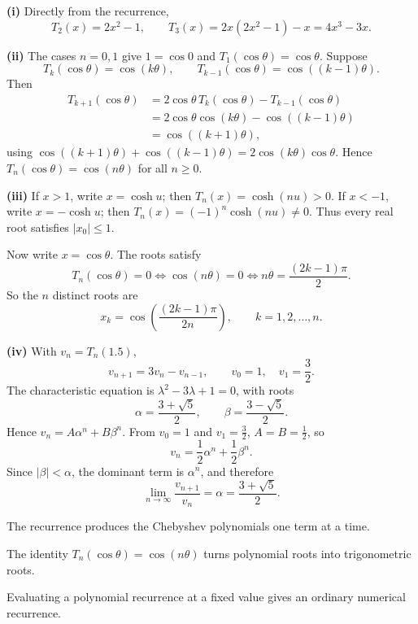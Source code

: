 \newpage
\begin{solution}
\textbf{(i)} Directly from the recurrence,
\[
T_2(x)=2x^2-1,\qquad
T_3(x)=2x(2x^2-1)-x=4x^3-3x.
\]

\textbf{(ii)} The cases $n=0,1$ give $1=\cos0$ and $T_1(\cos\theta)=\cos\theta$. Suppose
\[
T_k(\cos\theta)=\cos(k\theta),\qquad
T_{k-1}(\cos\theta)=\cos((k-1)\theta).
\]
Then
\[
\begin{aligned}
T_{k+1}(\cos\theta)
&=2\cos\theta\,T_k(\cos\theta)-T_{k-1}(\cos\theta)\\
&=2\cos\theta\cos(k\theta)-\cos((k-1)\theta)\\
&=\cos((k+1)\theta),
\end{aligned}
\]
using $\cos((k+1)\theta)+\cos((k-1)\theta)=2\cos(k\theta)\cos\theta$. Hence $T_n(\cos\theta)=\cos(n\theta)$ for all $n\ge0$.

\textbf{(iii)} If $x>1$, write $x=\cosh u$; then $T_n(x)=\cosh(nu)>0$. If $x<-1$, write $x=-\cosh u$; then $T_n(x)=(-1)^n\cosh(nu)\ne0$. Thus every real root satisfies $|x_0|\le1$.

Now write $x=\cos\theta$. The roots satisfy
\[
T_n(\cos\theta)=0\iff \cos(n\theta)=0
\iff n\theta=\frac{(2k-1)\pi}{2}.
\]
So the $n$ distinct roots are
\[
x_k=\cos\left(\frac{(2k-1)\pi}{2n}\right),\qquad k=1,2,\ldots,n.
\]

\textbf{(iv)} With $v_n=T_n(1.5)$,
\[
v_{n+1}=3v_n-v_{n-1},\qquad v_0=1,\quad v_1=\frac32.
\]
The characteristic equation is $\lambda^2-3\lambda+1=0$, with roots
\[
\alpha=\frac{3+\sqrt5}{2},\qquad \beta=\frac{3-\sqrt5}{2}.
\]
Hence $v_n=A\alpha^n+B\beta^n$. From $v_0=1$ and $v_1=\frac32$, $A=B=\frac12$, so
\[
v_n=\frac12\alpha^n+\frac12\beta^n.
\]
Since $|\beta|<\alpha$, the dominant term is $\alpha^n$, and therefore
\[
\lim_{n\to\infty}\frac{v_{n+1}}{v_n}=\alpha=\frac{3+\sqrt5}{2}.
\]
\end{solution}
\begin{takeaways}
\item The recurrence produces the Chebyshev polynomials one term at a time.
\item The identity $T_n(\cos\theta)=\cos(n\theta)$ turns polynomial roots into trigonometric roots.
\item Evaluating a polynomial recurrence at a fixed value gives an ordinary numerical recurrence.
\end{takeaways}
